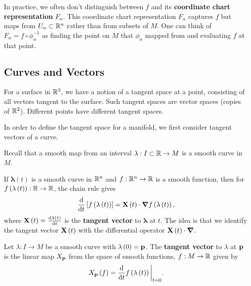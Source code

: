 \begin{examples}
\begin{enumerate}[label=\arabic*)]
        In practice, we often don't distinguish between $f$ and its \textbf{coordinate chart representation} $F_{\alpha}$. This coordinate chart representation $F_{\alpha}$ captures $f$ but maps from $U_{\alpha} \subset \mathbb{R}^{n}$ rather than from subsets of $M$. One can think of $F_{\alpha} = f \circ \phi_{\alpha}^{-1}$ as finding the point on $M$ that $\phi_\alpha$ mapped from and evaluating $f$ at that point.
    \end{enumerate}
\end{examples}

\subsection{Curves and Vectors}

For a surface in $\mathbb{R}^3$, we have a notion of a tangent space at a point, consisting of all vectors tangent to the surface. Such tangent spaces are vector spaces (copies of $\mathbb{R}^2$). Different points have different tangent spaces. 

In order to define the tangent space for a manifold, we first consider tangent vectors of a curve.

Recall that a smooth map from an interval $\lambda : I \subset \mathbb{R} \to M$ is a smooth curve in $M$.

If $\mathbf{\lambda} \left( t \right) $ is a smooth curve in $\mathbb{R}^{n}$ and $f : \mathbb{R}^{n} \to \mathbb{R}$ is a smooth function, then for $f \left( \mathbf{\lambda}\left( t \right)  \right) : \mathbb{R} \to \mathbb{R}$, the chain rule gives
\begin{align}
    \dv{t} \left[ f \left( \mathbf{\lambda}\left( t \right)  \right)  \right] = \vb{X}\left( t \right) \cdot \grad f\left( \mathbf{\lambda}\left( t \right)  \right) 
,\end{align}
where $\vb{X}\left( t \right) = \dv{\mathbf{\lambda}\left( t \right) }{t}$ is the \textbf{tangent vector} to $\mathbf{\lambda}$ at $t$. The idea is that we identify the tangent vector $\vb{X}\left( t \right) $ with the differential operator $\vb{X}\left( t \right) \cdot \grad $.

\begin{definition}
Let $\lambda : I \to M$ be a smooth curve with $\lambda \left( 0 \right) = \vb{p}$. The \textbf{tangent vector} to $\lambda$ at $\vb{p}$ is the linear map $X_{\vb{p}}$ from the space of smooth functions, $f : M \to \mathbb{R}$ given by
\begin{align}
    X_{\vb{p}}\left( f \right) = \dv{t} f\left( \lambda \left( t \right)  \right) \bigg|_{t = 0} \label{eq:tangent_vector}
.\end{align}
\end{definition}

